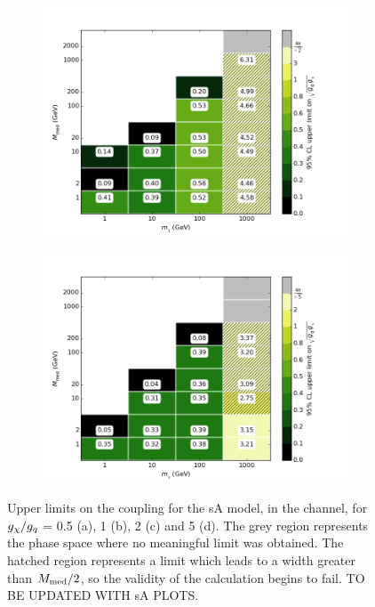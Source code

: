 \begin{figure}[h]
\begin{subfigure}[t]{0.45\textwidth}
      \includegraphics[width=1.\textwidth]{figures/grid_basepoints_SVD_rat2_monojet.png}
      \caption{}
    \end{subfigure}
    \begin{subfigure}[t]{0.45\textwidth}
      \centering
      \includegraphics[width=1.\textwidth]{figures/grid_basepoints_SVD_rat5_monojet.png}
      \caption{}
    \end{subfigure}
    \caption{Upper limits on the coupling for the sA model, in the \monojet channel, for $g_{\chi} / g_q$ = 0.5 (a), 1 (b), 2 (c) and 5 (d). The grey region represents the phase space where no meaningful limit was obtained. The hatched region represents a limit which leads to a width greater than $M_{\mathrm{med}} / 2$, so the validity of the calculation begins to fail. TO BE UPDATED WITH sA PLOTS.}
    \label{fig:Monojet_SVD_couplinglimit}
\end{figure}

